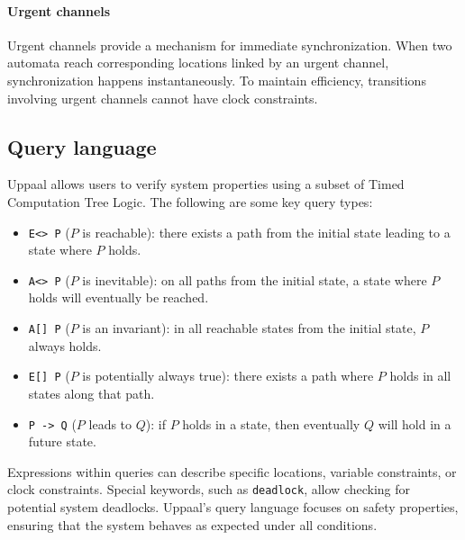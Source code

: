 \paragraph*{Urgent channels}
Urgent channels provide a mechanism for immediate synchronization. 
When two automata reach corresponding locations linked by an urgent channel, synchronization happens instantaneously. 
To maintain efficiency, transitions involving urgent channels cannot have clock constraints.

\subsection{Query language}
Uppaal allows users to verify system properties using a subset of Timed Computation Tree Logic. 
The following are some key query types:
\begin{itemize}
\item \texttt{E<> P} ($P$ is reachable): there exists a path from the initial state leading to a state where $P$ holds.
\item \texttt{A<> P} ($P$ is inevitable): on all paths from the initial state, a state where $P$ holds will eventually be reached.
\item \texttt{A[] P} ($P$ is an invariant): in all reachable states from the initial state, $P$ always holds.
\item \texttt{E[] P} ($P$ is potentially always true): there exists a path where $P$ holds in all states along that path.
\item \texttt{P -> Q} ($P$ leads to $Q$): if $P$ holds in a state, then eventually $Q$ will hold in a future state. 
\end{itemize}
\noindent Expressions within queries can describe specific locations, variable constraints, or clock constraints. 
Special keywords, such as \texttt{deadlock}, allow checking for potential system deadlocks.
 Uppaal's query language focuses on safety properties, ensuring that the system behaves as expected under all conditions.
